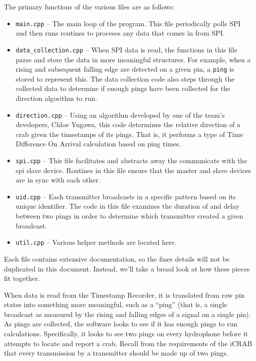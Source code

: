 \documentclass[12pt]{article}
\begin{document}
The primary functions of the various files are as follows:
\begin{itemize}
\item \texttt{main.cpp} --
	The main loop of the program. This file periodically polls SPI and
	then runs routines to proceses any data that comes in from SPI.
\item \texttt{data\_collection.cpp} --
	When SPI data is read, the functions in this file parse and store the
	data in more meaningful structures.
	For example, when a rising and subsequent falling edge are detected on a
	given pin, a \texttt{ping} is stored to represent this.
	The data collection code also steps through the collected data to determine
	if enough pings have been collected for the direction algorithm to run.
\item \texttt{direction.cpp} --
	Using an algorithm developed by one of the team's developers, Chloe Yugawa,
	this code determines the relative direction of a crab given the timestamps
	of its pings.
	That is, it performs a type of Time Difference On Arrival calculation
	based on ping times.
\item \texttt{spi.cpp} --
	This file facilitates and abstracts away the communicate with the
	\gls{spi} slave device.
	Routines in this file ensure that the master and slave devices are in
	sync with each other.
\item \texttt{uid.cpp} --
	Each transmitter broadcasts in a specific pattern based on its unique
	identifier. The code in this file examines the duration of and delay
	between two pings in order to determine which transmitter created a
	given broadcast.
\item \texttt{util.cpp} --
	Various helper methods are located here.
\end{itemize}

Each file contains extensive documentation, so the finer details will not be
duplicated in this document. Instead, we'll take a broad look at how these
pieces fit together.

When data is read from the Timestamp Recorder, it is translated from raw pin
states into something more meaningful, such as a ``ping'' (that is, a single
broadcast as measured by the rising and falling edges of a signal on a single
pin).
As pings are collected, the software looks to see if it has enough pings to
run calculations.
Specifically, it looks to see two pings on every hydrophone before it attempts
to locate and report a crab.
Recall from the requirements of the \gls{iCRAB} that every transmission by
a transmitter should be made up of two pings.
\end{document}
